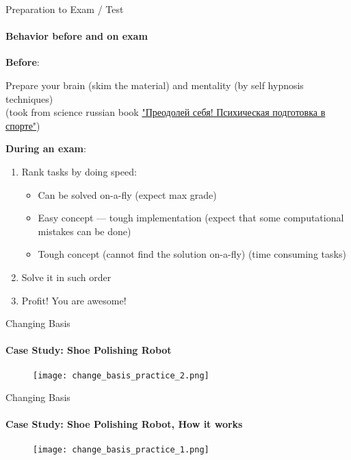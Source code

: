 \documentclass[aspectratio=169]{beamer}
\begin{document}
\begin{frame}[t]{Preparation to Exam / Test}
    \vspace{-0.5cm}
    \framesubtitle{Behavior before and on exam}
    \textbf{Before}:

    Prepare your brain (skim the material) and mentality (by self hypnosis techniques) \\ (took from science russian book \href{https://yadi.sk/d/uZhNSQW637Q3v7}{"Преодолей себя! Психическая подготовка в спорте"}) \smallskip

    \textbf{During an exam}:
    \begin{enumerate}
        \item Rank tasks by doing speed: \begin{itemize}
                  \item Can be solved on-a-fly (expect max grade)
                  \item Easy concept --- tough implementation (expect that some computational mistakes can be done)
                  \item Tough concept (cannot find the solution on-a-fly) (time consuming tasks)
              \end{itemize}
        \item Solve it in such order
        \item Profit! You are awesome!
    \end{enumerate}
\end{frame}

\begin{frame}[t]{Changing Basis}
    \framesubtitle{Case Study: Shoe Polishing Robot}
    \vspace{-0.6cm}
    \begin{figure}[H]
        \centering\texttt{[image: change\_basis\_practice\_2.png]}
        \label{fig:change_basis_practice_2.png}
    \end{figure}
\end{frame}

\begin{frame}[t]{Changing Basis}
    \framesubtitle{Case Study: Shoe Polishing Robot, How it works}
    \vspace{-0.6cm}
    \begin{figure}[H]
        \centering\texttt{[image: change\_basis\_practice\_1.png]}
        \label{fig:change_basis_practice_1.png}
    \end{figure}
\end{frame}
\end{document}
